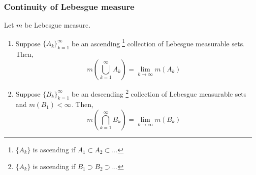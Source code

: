\subsubsection{Continuity of Lebesgue measure}
\begin{theorem}[continuity]
	Let $m$ be Lebesgue measure.
\begin{enumerate}
	\item
	Suppose $\{ A_k \}_{k=1}^\infty$ be an ascending
	\footnote{$\{A_k\}$ is ascending if $A_1 \subset A_2 \subset \dots$}
	collection of Lebesgue measurable sets.
	Then, 
	\begin{equation}
		m \left( \bigcup_{k=1}^\infty A_k \right) = \lim_{k \to \infty} m(A_k)
	\end{equation}
	\item
	Suppose $\{ B_k \}_{k=1}^\infty$ be an descending
	\footnote{$\{A_k\}$ is ascending if $B_1 \supset B_2 \supset \dots$}
	collection of Lebesgue measurable sets and $m(B_1) < \infty$.
	Then, 
	\begin{equation}
		m \left( \bigcap_{k=1}^\infty B_k \right) = \lim_{k \to \infty} m(B_k)
	\end{equation}
	\end{enumerate}
\end{theorem}
